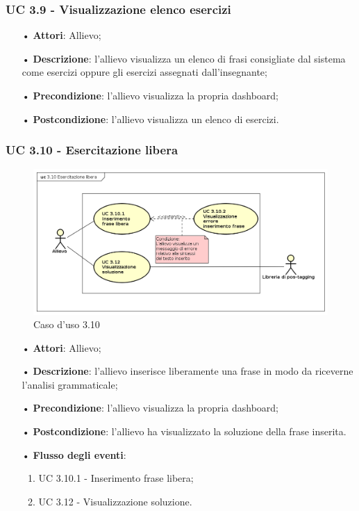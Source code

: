 \subsubsection{UC 3.9 - Visualizzazione elenco esercizi}
\begin{itemize}
\item[•]\textbf{Attori}: Allievo;
\item[•]\textbf{Descrizione}: l'allievo visualizza un elenco di frasi consigliate dal sistema come esercizi oppure gli esercizi assegnati dall'insegnante;
\item[•]\textbf{Precondizione}: l'allievo visualizza la propria dashboard;
\item[•]\textbf{Postcondizione}: l'allievo visualizza un elenco di esercizi.
\end{itemize}

\subsubsection{UC 3.10 - Esercitazione libera}
\begin{figure}[H]
	\centering
	\includegraphics[width=17cm]{img/UC310.png} 
	\caption{Caso d'uso 3.10}\label{fig:310}
\end{figure}
\begin{itemize}
\item[•]\textbf{Attori}: Allievo;
\item[•]\textbf{Descrizione}: l'allievo inserisce liberamente una frase in modo da riceverne l'analisi grammaticale;
\item[•]\textbf{Precondizione}: l'allievo visualizza la propria dashboard;
\item[•]\textbf{Postcondizione}: l'allievo ha visualizzato la soluzione della frase inserita.
\item[•]\textbf{Flusso degli eventi}:
\begin{enumerate}
	\item UC 3.10.1 - Inserimento frase libera;
	\item UC 3.12 - Visualizzazione soluzione.
\end{enumerate}
\end{itemize}

